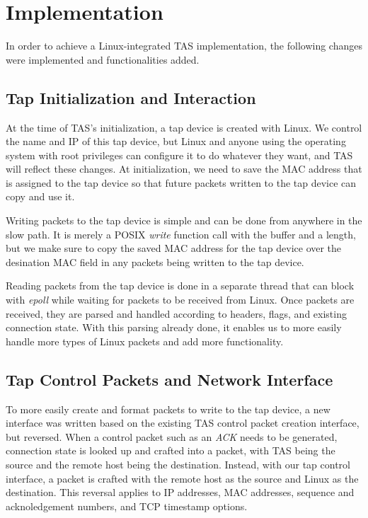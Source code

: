 \section{Implementation}

In order to achieve a Linux-integrated TAS implementation, the following 
changes were implemented and functionalities added.

\subsection{Tap Initialization and Interaction}

At the time of TAS's initialization, a tap device is created with Linux.
We control the name and IP of this tap device, but Linux and anyone using the
operating system with root privileges can configure it to do whatever they
want, and TAS will reflect these changes. At initialization, we need to
save the MAC address that is assigned to the tap device so that future packets
written to the tap device can copy and use it. 

Writing packets to the tap device is simple and can be done from anywhere in the
slow path. It is merely a POSIX \textit{write} function call with the buffer and a length, but we 
make sure to copy the saved MAC address for the tap device over the desination
MAC field in any packets being written to the tap device. 

Reading packets from the tap device is done in a separate thread that can block
with \textit{epoll} while waiting for packets to be received from Linux. Once packets are
received, they are parsed and handled according to headers, flags, and existing
connection state. With this parsing already done, it enables us to more easily
handle more types of Linux packets and add more functionality. 

\subsection{Tap Control Packets and Network Interface}

To more easily create and format packets to write to the tap device, a new
interface was written based on the existing TAS control packet creation
interface, but reversed. When a control packet such as an \textit{ACK} needs to be 
generated, connection state is looked up and crafted into a packet, with
TAS being the source and the remote host being the destination. Instead,
with our tap control interface, a packet is crafted with the remote host as
the source and Linux as the destination. This reversal applies to IP addresses,
MAC addresses, sequence and acknoledgement numbers, and TCP timestamp options.

